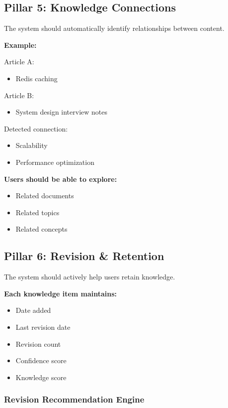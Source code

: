 \documentclass[11pt]{article}
\begin{document}
\subsection{Pillar 5: Knowledge Connections}

The system should automatically identify relationships between content.

\textbf{Example:}

Article A:
\begin{itemize}[nosep]
    \item Redis caching
\end{itemize}

Article B:
\begin{itemize}[nosep]
    \item System design interview notes
\end{itemize}

Detected connection:
\begin{itemize}[nosep]
    \item Scalability
    \item Performance optimization
\end{itemize}

\textbf{Users should be able to explore:}
\begin{itemize}[nosep]
    \item Related documents
    \item Related topics
    \item Related concepts
\end{itemize}

\subsection{Pillar 6: Revision \& Retention}

The system should actively help users retain knowledge.

\textbf{Each knowledge item maintains:}
\begin{itemize}[nosep]
    \item Date added
    \item Last revision date
    \item Revision count
    \item Confidence score
    \item Knowledge score
\end{itemize}

\subsubsection{Revision Recommendation Engine}
\end{document}
